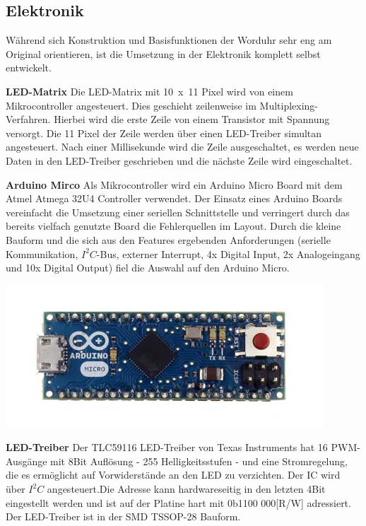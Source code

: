 \begin{multicols}{2}
\section{Elektronik}
\label{sec:Elektronik}
Während sich Konstruktion und Basisfunktionen der Worduhr sehr eng am Original orientieren, ist die Umsetzung in der Elektronik komplett selbst entwickelt.

\textbf{LED-Matrix} Die LED-Matrix mit 10~x~11 Pixel wird von einem Mikrocontroller angesteuert. Dies geschieht zeilenweise im Multiplexing-Verfahren. Hierbei wird die erste Zeile von einem Transistor mit Spannung versorgt. Die 11 Pixel der Zeile werden über einen LED-Treiber simultan angesteuert. Nach einer Millisekunde wird die Zeile ausgeschaltet, es werden neue Daten in den LED-Treiber geschrieben und die nächste Zeile wird eingeschaltet. 

\textbf{Arduino Mirco} Als Mikrocontroller wird ein Arduino Micro Board mit dem Atmel Atmega 32U4 Controller verwendet. Der Einsatz eines Arduino Boards vereinfacht die Umsetzung einer seriellen Schnittstelle und verringert durch das bereits vielfach genutzte Board die Fehlerquellen im Layout. Durch die kleine Bauform und die sich aus den Features ergebenden Anforderungen (serielle Kommunikation, $I^{2}C$-Bus, externer Interrupt, 4x Digital Input, 2x Analogeingang und 10x Digital Output) fiel die Auswahl auf den Arduino Micro.

\includegraphics[width=\columnwidth]{Abbildungen/Elektronik/ArduinoMicro}

\textbf{LED-Treiber} Der TLC59116 LED-Treiber von Texas Instruments hat 16 PWM-Ausgänge mit 8Bit Auflösung - 255 Helligkeitsstufen - und eine Stromregelung, die es ermöglicht auf Vorwiderstände an den LED zu verzichten. Der IC wird über $I^{2}C$ angesteuert.Die Adresse kann hardwareseitig in den letzten 4Bit eingestellt werden und ist auf der Platine hart mit 0b1100 000[R/W] adressiert. Der LED-Treiber ist in der SMD TSSOP-28 Bauform.


\end{multicols}
